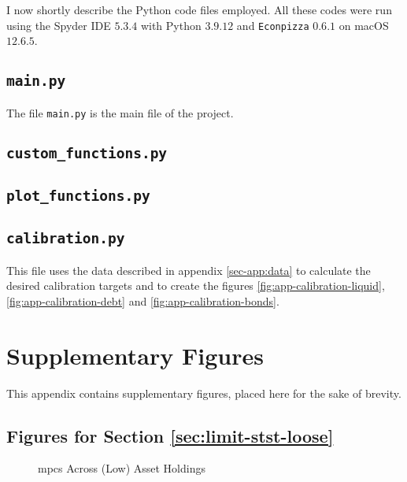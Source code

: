 \documentclass[12pt]{article} %
\numberwithin{equation}{section} %
\numberwithin{figure}{section}
\numberwithin{table}{section}
\begin{document}
\begin{refsection}
\begin{appendices}
I now shortly describe the Python code files employed. All these codes were run using the Spyder IDE $5.3.4$ with Python $3.9.12$ and \texttt{Econpizza} $0.6.1$ on macOS $12.6.5$.

\subsection*{\texttt{main.py}}

The file \texttt{main.py} is the main file of the project.

\subsection*{\texttt{custom\_functions.py}}

\subsection*{\texttt{plot\_functions.py}}

\subsection*{\texttt{calibration.py}}

This file uses the data described in appendix \ref{sec-app:data} to calculate the desired calibration targets and to create the figures \ref{fig:app-calibration-liquid}, \ref{fig:app-calibration-debt} and \ref{fig:app-calibration-bonds}.

\thispagestyle{plain}
\section{Supplementary Figures}
\label{sec-app:figures}

This appendix contains supplementary figures, placed here for the sake of brevity.

\subsection{Figures for Section \ref{sec:limit-stst-loose}}
\label{sec-app:figures-limit-loose}

\begin{figure}[H]
    \centering
    \caption{\Gls{mpc}s Across (Low) Asset Holdings}
    \label{fig:baseline-limit-initial-mpcs}
    
\end{figure}


\end{appendices}
\end{refsection}
\end{document}
